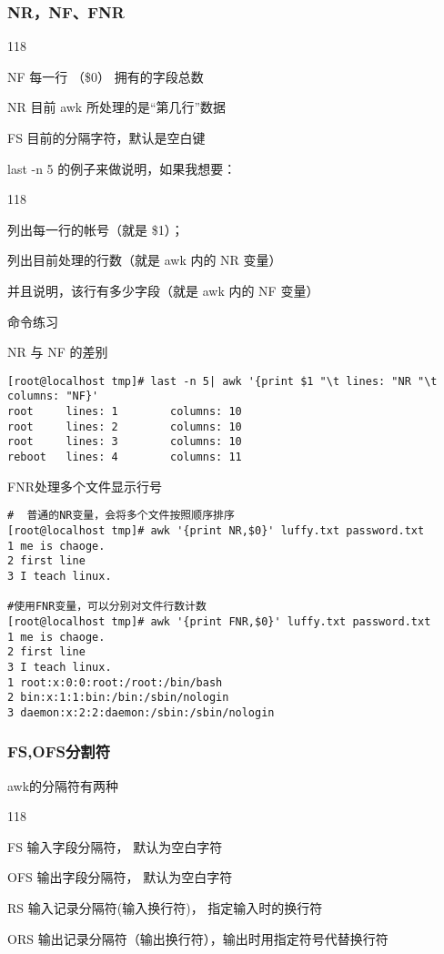 \subsubsection{NR，NF、FNR}
\begin{dinglist}{118}
	\item NF 每一行 （\$0） 拥有的字段总数
	\item NR 目前 awk 所处理的是“第几行”数据
	\item FS 目前的分隔字符，默认是空白键
\end{dinglist}
last -n 5 的例子来做说明，如果我想要：
\begin{dinglist}{118}
	\item 列出每一行的帐号（就是 \$1）；
	\item 列出目前处理的行数（就是 awk 内的 NR 变量）
	\item 并且说明，该行有多少字段（就是 awk 内的 NF 变量）
\end{dinglist}
\begin{ascolorbox10}{命令练习}
	\begin{ascboxJ}{NR 与 NF 的差别}
		\begin{lstlisting}[style=linux]
[root@localhost tmp]# last -n 5| awk '{print $1 "\t lines: "NR "\t columns: "NF}'
root     lines: 1        columns: 10
root     lines: 2        columns: 10
root     lines: 3        columns: 10
reboot   lines: 4        columns: 11
		\end{lstlisting}
	\end{ascboxJ}
	\begin{ascboxJ}{FNR处理多个文件显示行号}
	\begin{lstlisting}[style=linux]
#  普通的NR变量，会将多个文件按照顺序排序
[root@localhost tmp]# awk '{print NR,$0}' luffy.txt password.txt
1 me is chaoge.
2 first line
3 I teach linux.

#使用FNR变量，可以分别对文件行数计数
[root@localhost tmp]# awk '{print FNR,$0}' luffy.txt password.txt
1 me is chaoge.
2 first line
3 I teach linux.
1 root:x:0:0:root:/root:/bin/bash
2 bin:x:1:1:bin:/bin:/sbin/nologin
3 daemon:x:2:2:daemon:/sbin:/sbin/nologin
	\end{lstlisting}
\end{ascboxJ}
\end{ascolorbox10}

\subsubsection{FS,OFS分割符}
awk的分隔符有两种
\begin{dinglist}{118}
	\item FS	输入字段分隔符， 默认为空白字符
	\item OFS	输出字段分隔符， 默认为空白字符
	\item RS	输入记录分隔符(输入换行符)， 指定输入时的换行符
	\item ORS	输出记录分隔符（输出换行符），输出时用指定符号代替换行符
\end{dinglist}

